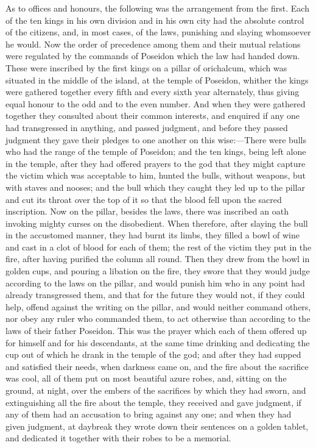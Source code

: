 \documentclass[11pt,letter]{article}
\begin{document}
\par  As to offices and honours, the following was the arrangement from the first. Each of the ten kings in his own division and in his own city had the absolute control of the citizens, and, in most cases, of the laws, punishing and slaying whomsoever he would. Now the order of precedence among them and their mutual relations were regulated by the commands of Poseidon which the law had handed down. These were inscribed by the first kings on a pillar of orichalcum, which was situated in the middle of the island, at the temple of Poseidon, whither the kings were gathered together every fifth and every sixth year alternately, thus giving equal honour to the odd and to the even number. And when they were gathered together they consulted about their common interests, and enquired if any one had transgressed in anything, and passed judgment, and before they passed judgment they gave their pledges to one another on this wise:—There were bulls who had the range of the temple of Poseidon; and the ten kings, being left alone in the temple, after they had offered prayers to the god that they might capture the victim which was acceptable to him, hunted the bulls, without weapons, but with staves and nooses; and the bull which they caught they led up to the pillar and cut its throat over the top of it so that the blood fell upon the sacred inscription. Now on the pillar, besides the laws, there was inscribed an oath invoking mighty curses on the disobedient. When therefore, after slaying the bull in the accustomed manner, they had burnt its limbs, they filled a bowl of wine and cast in a clot of blood for each of them; the rest of the victim they put in the fire, after having purified the column all round. Then they drew from the bowl in golden cups, and pouring a libation on the fire, they swore that they would judge according to the laws on the pillar, and would punish him who in any point had already transgressed them, and that for the future they would not, if they could help, offend against the writing on the pillar, and would neither command others, nor obey any ruler who commanded them, to act otherwise than according to the laws of their father Poseidon. This was the prayer which each of them offered up for himself and for his descendants, at the same time drinking and dedicating the cup out of which he drank in the temple of the god; and after they had supped and satisfied their needs, when darkness came on, and the fire about the sacrifice was cool, all of them put on most beautiful azure robes, and, sitting on the ground, at night, over the embers of the sacrifices by which they had sworn, and extinguishing all the fire about the temple, they received and gave judgment, if any of them had an accusation to bring against any one; and when they had given judgment, at daybreak they wrote down their sentences on a golden tablet, and dedicated it together with their robes to be a memorial.
\end{document}

